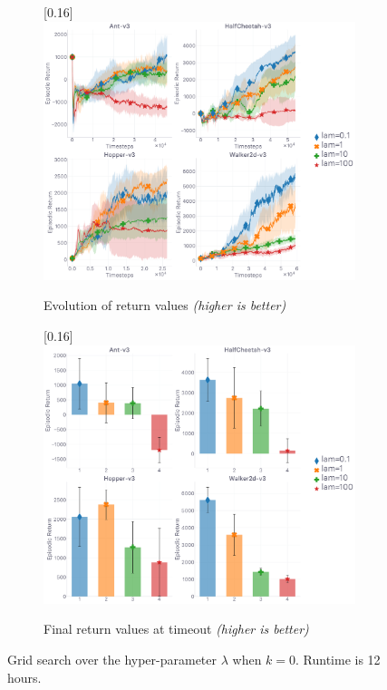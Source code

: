 \begin{figure}[H]
  \center
  \begin{subfigure}[t]{0.49\textwidth}
    \center\scalebox{0.16}[0.16]{\includegraphics{Plots/fig17_k0_lam_gs_4envs/plots_eval_env_ret_plot.pdf}}
    \caption{Evolution of return values \textit{(higher is better)}}
  \end{subfigure}
  \begin{subfigure}[t]{0.49\textwidth}
    \center\scalebox{0.16}[0.16]{\includegraphics{Plots/fig17_k0_lam_gs_4envs/plots_eval_env_ret_barplot.pdf}}
    \caption{Final return values at timeout \textit{(higher is better)}}
  \end{subfigure}
  \caption{
  Grid search over the hyper-parameter $\lambda$ when $k=0$.
  Runtime is 12 hours.}
\end{figure}

